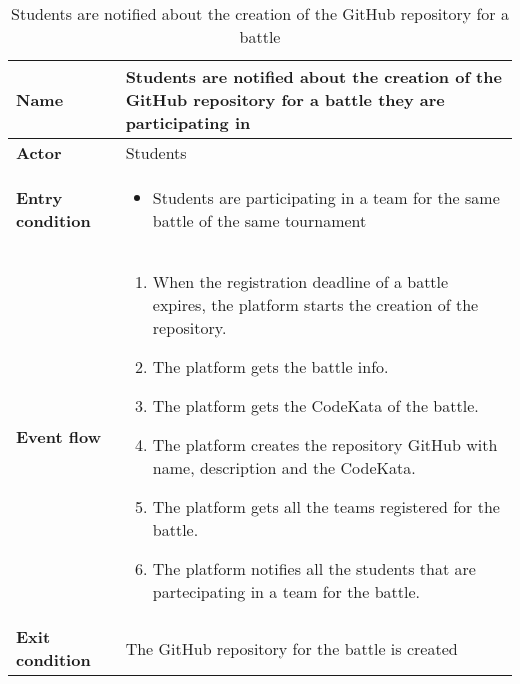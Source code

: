 \begin{enumerate}[label=\textbf{UC\arabic*}:,ref=UC\arabic*,leftmargin=1.3cm]
{\begin{table}[H]
\begin{tabular}{|l|p{11.9cm}|}
                        \hline
                        \textbf{Name}            & Students are notified about the creation of the GitHub repository for a battle they are participating in \\\hline
                        \textbf{Actor}           & Students                                                                                                 \\\hline
                        \textbf{Entry condition} &
                        \begin{itemize}
                              \item Students are participating in a team for the same battle of the same tournament
                        \end{itemize}                                                \\\hline
                        \textbf{Event flow}      &
                        \begin{enumerate}[label=\arabic*.]
                              \item When the registration deadline of a battle expires, the platform starts the creation of the repository.
                              \item The platform gets the battle info.
                              \item The platform gets the CodeKata of the battle.
                              \item The platform creates the repository GitHub with name, description and the CodeKata.
                              \item The platform gets all the teams registered for the battle.
                              \item The platform notifies all the students that are partecipating in a team for the battle.
                        \end{enumerate}                        \\\hline
                        \textbf{Exit condition}  & The GitHub repository for the battle is created                                                          \\\hline
                  \end{tabular}
                  \caption{Students are notified about the creation of the GitHub repository for a battle  }

\end{table}}
\end{enumerate}

